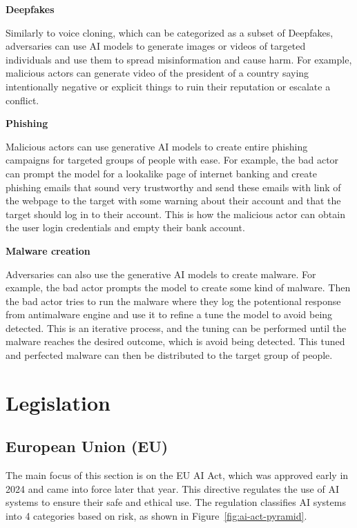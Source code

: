 \textbf{Deepfakes}

Similarly to voice cloning, which can be categorized as a subset of Deepfakes, adversaries can use AI models to generate images or videos of targeted individuals and use them to spread misinformation and cause harm. For example, malicious actors can generate video of the president of a country saying intentionally negative or explicit things to ruin their reputation or escalate a conflict.

\textbf{Phishing}

Malicious actors can use generative AI models to create entire phishing campaigns for targeted groups of people with ease. For example, the bad actor can prompt the model for a lookalike page of internet banking and create phishing emails that sound very trustworthy and send these emails with link of the webpage to the target with some warning about their account and that the target should log in to their account. This is how the malicious actor can obtain the user login credentials and empty their bank account.

\textbf{Malware creation}

Adversaries can also use the generative AI models to create malware. For example, the bad actor prompts the model to create some kind of malware. Then the bad actor tries to run the malware where they log the potentional response from antimalware engine and use it to refine a tune the model to avoid being detected. This is an iterative process, and the tuning can be performed until the malware reaches the desired outcome, which is avoid being detected. This tuned and perfected malware can then be distributed to the target group of people.


\section{Legislation} \label{sec:legislation}

\subsection{European Union (EU)}
The main focus of this section is on the EU AI Act\cite{eu_ai_act_2024}, which was approved early in 2024 and came into force later that year. This directive regulates the use of AI systems to ensure their safe and ethical use. The regulation classifies AI systems into 4 categories based on risk, as shown in Figure~\ref{fig:ai-act-pyramid}.

